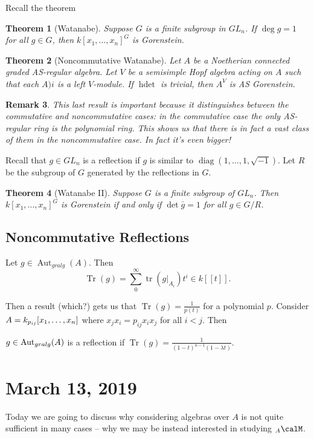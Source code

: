 \documentclass[12pt]{article}
\theoremstyle{break}
\theoremstyle{nonumberbreak}
\theoremstyle{changebreak}
\newtheorem{thm}{Theorem}[subsection]
\theoremstyle{break}
\theoremstyle{nonumberbreak}
\theoremstyle{nonumberplain}
\theoremstyle{change}
\newtheorem{rmk}[thm]{Remark}
\DeclareMathOperator{\Aut}{Aut}
\let\tilde\relax
\newcommand*{\tilde}[1]{\widetilde{#1}}
\begin{document}
Recall the theorem
\begin{thm}[Watanabe]
	Suppose $G$ is a finite subgroup in $GL_n$. If $\deg g=1$ for all $g\in G$, then $k[x_1,\dots,x_n]^G$ is Gorenstein.
\end{thm}
\begin{thm}[Noncommutative Watanabe]
	Let $A$ be a Noetherian connected graded AS-regular algebra. Let $V$ be a semisimple Hopf algebra acting on 
	$A$ such that each $A)i$ is a left $V$-module. If $\operatorname{hdet}$ is trivial, then $A^V$ is AS Gorenstein.
\end{thm}
\begin{rmk}
	This last result is important because it distinguishes between the commutative and noncommutative cases: in the commutative
	case the only AS-regular ring is the polynomial ring. This shows us that there is in fact a vast class of them 
	in the noncommutative case. In fact it's even bigger!
\end{rmk}
Recall that $g\in GL_n$ is a reflection if $g$ is similar to $\operatorname{diag}(1,\dots,1,\sqrt{-1})$. Let $R$ be the subgroup of $G$ generated
by the reflections in $G$. 
\begin{thm}[Watanabe II]
	Suppose $G$ is a finite subgroup of $GL_n$. Then $k[x_1,\dots,x_n]^G$ is Gorenstein if and only if
	$\det \bar g=1$ for all $g\in G/R$.
\end{thm}

\subsection{Noncommutative Reflections}
\begin{defn}
	Let $g\in\Aut_{gralg}(A)$. Then
	\[\operatorname{Tr}(g)=\sum_0^\infty \operatorname{tr}(g|_{A_i})t^i\in k[[t]].\]
\end{defn}
Then a result (which?) gets us that $\operatorname{Tr}(g)=\frac{1}{p(t)}$ for a polynomial $p$.
Consider $\tilde A=k_{p_{ij}}[x_1,\dots,x_n]$ where $x_jx_i=p_{ij}x_ix_j$ for all $i<j$. Then 
\begin{defn}
	$g\in\Aut_{gralg}(\tilde A)$ is a reflection if $\operatorname{Tr}(g)=\frac{1}{(1-t)^{n-1}(1-\lambda t)}$.
\end{defn}

\section{March 13, 2019}
Today we are going to discuss why considering algebras over $A$ is not quite sufficient in many cases --
why we may be instead interested in studying $_A\calM$.
\end{document}
